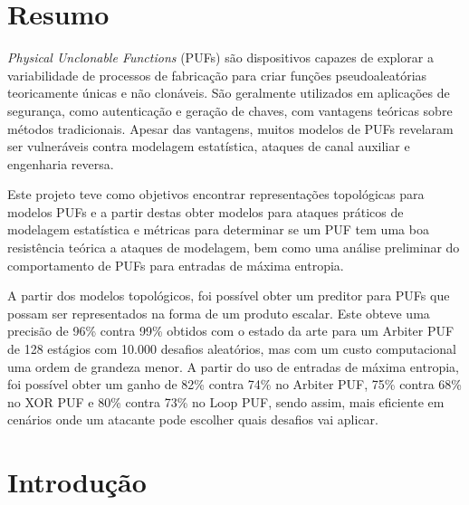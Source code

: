\documentclass[pdftex,11pt]{article}
\begin{document}
\begin{spacing}{1.5}


\section*{Resumo}

\textit{Physical Unclonable Functions} (PUFs) são dispositivos capazes de explorar a variabilidade de processos de fabricação para criar funções pseudoaleatórias teoricamente únicas e não clonáveis. São geralmente utilizados em aplicações de segurança, como autenticação e geração de chaves, com vantagens teóricas sobre métodos tradicionais. Apesar das vantagens, muitos modelos de PUFs revelaram ser vulneráveis contra modelagem estatística, ataques de canal auxiliar e engenharia reversa.

Este projeto teve como objetivos encontrar representações topológicas para modelos PUFs e a partir destas obter modelos para ataques práticos de modelagem estatística e métricas para determinar se um PUF tem uma boa resistência teórica a ataques de modelagem, bem como uma análise preliminar do comportamento de PUFs para entradas de máxima entropia.

A partir dos modelos topológicos, foi possível obter um preditor para PUFs que possam ser representados na forma de um produto escalar. Este  obteve uma precisão de 96\% contra 99\% obtidos com o estado da arte para um Arbiter PUF de 128 estágios com 10.000 desafios aleatórios, mas com um custo computacional uma ordem de grandeza menor. A partir do uso de entradas de máxima entropia, foi possível obter um ganho de 82\% contra 74\% no Arbiter PUF, 75\% contra 68\% no XOR PUF e 80\% contra 73\% no Loop PUF, sendo assim, mais eficiente em cenários onde um atacante pode escolher quais desafios vai aplicar.


\section{Introdução}\label{sec:introducao}


\end{spacing}
\end{document}
